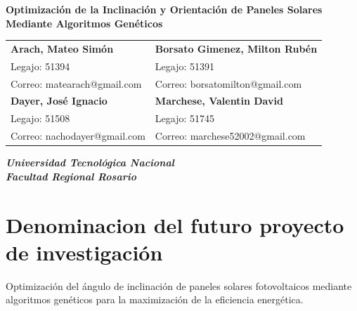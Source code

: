 \documentclass[12pt, a4paper]{article}
\begin{document}
\begin{titlepage}

\centering

{\fontsize{16}{20}\selectfont\bfseries
Optimización de la Inclinación y Orientación de Paneles Solares Mediante Algoritmos Genéticos\par}

\vspace{1.5cm}

\begin{minipage}{0.9\textwidth}
\centering
\begin{tabular}{p{} p{}}

\centering\textbf{Arach, Mateo Simón} &
\centering\textbf{Borsato Gimenez, Milton Rubén}\tabularnewline[0.5cm]

\centering Legajo: 51394 &
\centering Legajo: 51391\tabularnewline

\centering Correo: matearach@gmail.com &
\centering Correo: borsatomilton@gmail.com\tabularnewline[0.8cm]

\centering\textbf{Dayer, José Ignacio} &
\centering\textbf{Marchese, Valentin David}\tabularnewline[0.5cm]

\centering Legajo: 51508 &
\centering Legajo: 51745\tabularnewline

\centering Correo: nachodayer@gmail.com &
\centering Correo: marchese52002@gmail.com\tabularnewline

\end{tabular}
\end{minipage}

\vspace{1.5cm}

{\fontsize{12}{15}\selectfont\bfseries\itshape
Universidad Tecnológica Nacional\\
Facultad Regional Rosario
}

\vfill

\end{titlepage}

\setcounter{section}{2}

\section{Denominacion del futuro proyecto de investigación}
Optimización del ángulo de inclinación de paneles solares fotovoltaicos mediante algoritmos genéticos para la maximización de la eficiencia energética.
\end{document}
